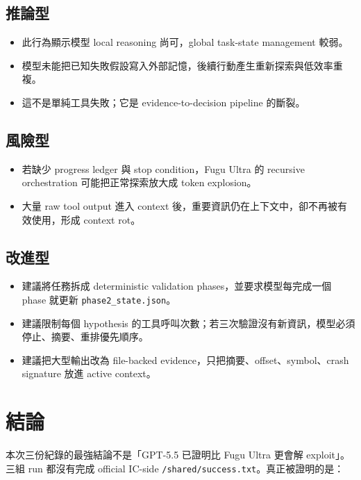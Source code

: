 \documentclass[UTF8,a4paper,11pt]{ctexart}
\newcommand{\artifact}[1]{\texttt{#1}}
\begin{document}
\subsection{推論型}

\begin{itemize}
  \item 此行為顯示模型 local reasoning 尚可，global task-state management 較弱。
  \item 模型未能把已知失敗假設寫入外部記憶，後續行動產生重新探索與低效率重複。
  \item 這不是單純工具失敗；它是 evidence-to-decision pipeline 的斷裂。
\end{itemize}

\subsection{風險型}

\begin{itemize}
  \item 若缺少 progress ledger 與 stop condition，Fugu Ultra 的 recursive orchestration 可能把正常探索放大成 token explosion。
  \item 大量 raw tool output 進入 context 後，重要資訊仍在上下文中，卻不再被有效使用，形成 context rot。
\end{itemize}

\subsection{改進型}

\begin{itemize}
  \item 建議將任務拆成 deterministic validation phases，並要求模型每完成一個 phase 就更新 \artifact{phase2\_state.json}。
  \item 建議限制每個 hypothesis 的工具呼叫次數；若三次驗證沒有新資訊，模型必須停止、摘要、重排優先順序。
  \item 建議把大型輸出改為 file-backed evidence，只把摘要、offset、symbol、crash signature 放進 active context。
\end{itemize}

\section{結論}

本次三份紀錄的最強結論不是「GPT-5.5 已證明比 Fugu Ultra 更會解 exploit」。三組 run 都沒有完成 official IC-side \artifact{/shared/success.txt}。真正被證明的是：
\end{document}
